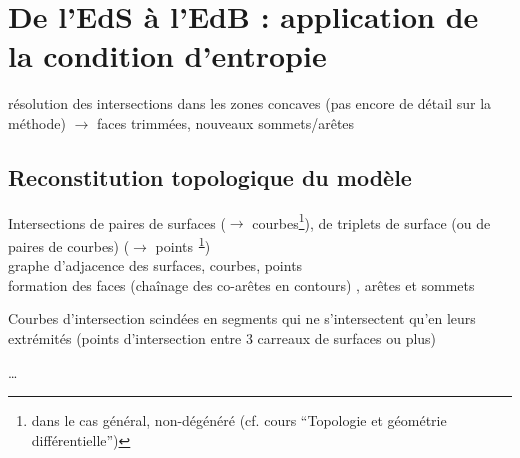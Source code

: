 \section{De l'EdS à l'EdB : application de la condition d'entropie}
résolution des intersections dans les zones concaves (pas encore de détail sur la méthode) $\to$ faces trimmées, nouveaux sommets/arêtes

\subsection{Reconstitution topologique du modèle \brep}
Intersections de paires de surfaces ($\to$ courbes\footnote{dans le cas général, non-dégénéré (cf. cours ``Topologie et géométrie différentielle'')\label{foot}}), de triplets de surface (ou de paires de courbes) ($\to$ points\textsuperscript{~\ref{foot}})\\
graphe d'adjacence des surfaces, courbes, points \cite[Chap. 4]{pentcheva2010}\\
formation des faces (chaînage des co-arêtes en contours) \cite[Chap. 7]{pentcheva2010}, arêtes et sommets \cite[Chap. 5]{pentcheva2010}

\par\medskip

Courbes d'intersection scindées en segments qui ne s'intersectent qu'en leurs extrémités (points d'intersection entre 3 carreaux de surfaces ou plus)



\ldots


